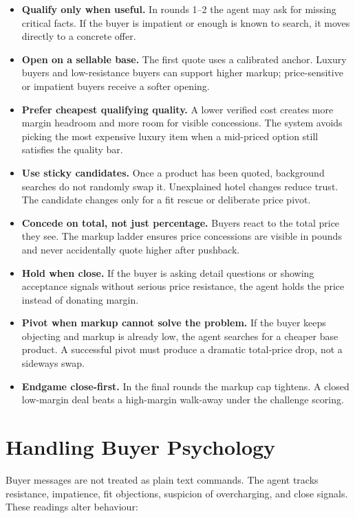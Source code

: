 \documentclass[10pt,a4paper]{article}
\begin{document}
\begin{itemize}
  \item \textbf{Qualify only when useful.} In rounds 1--2 the agent may ask for missing critical facts. If the buyer is impatient or enough is known to search, it moves directly to a concrete offer.
  \item \textbf{Open on a sellable base.} The first quote uses a calibrated anchor. Luxury buyers and low-resistance buyers can support higher markup; price-sensitive or impatient buyers receive a softer opening.
  \item \textbf{Prefer cheapest qualifying quality.} A lower verified cost creates more margin headroom and more room for visible concessions. The system avoids picking the most expensive luxury item when a mid-priced option still satisfies the quality bar.
  \item \textbf{Use sticky candidates.} Once a product has been quoted, background searches do not randomly swap it. Unexplained hotel changes reduce trust. The candidate changes only for a fit rescue or deliberate price pivot.
  \item \textbf{Concede on total, not just percentage.} Buyers react to the total price they see. The markup ladder ensures price concessions are visible in pounds and never accidentally quote higher after pushback.
  \item \textbf{Hold when close.} If the buyer is asking detail questions or showing acceptance signals without serious price resistance, the agent holds the price instead of donating margin.
  \item \textbf{Pivot when markup cannot solve the problem.} If the buyer keeps objecting and markup is already low, the agent searches for a cheaper base product. A successful pivot must produce a dramatic total-price drop, not a sideways swap.
  \item \textbf{Endgame close-first.} In the final rounds the markup cap tightens. A closed low-margin deal beats a high-margin walk-away under the challenge scoring.
\end{itemize}

\section*{Handling Buyer Psychology}
Buyer messages are not treated as plain text commands. The agent tracks resistance, impatience, fit objections, suspicion of overcharging, and close signals. These readings alter behaviour:
\end{document}
